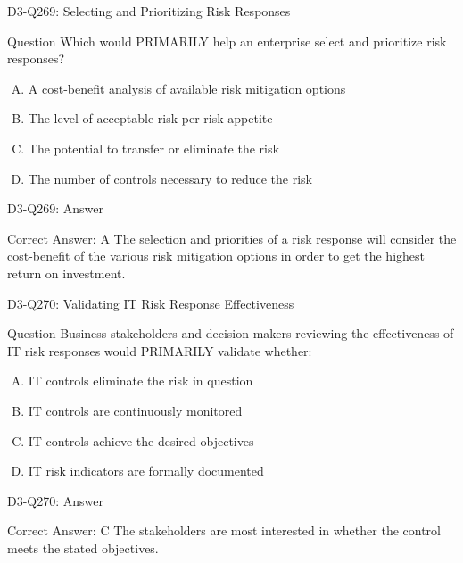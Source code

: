 \documentclass{beamer}
\begin{document}
	\begin{frame}{D3-Q269: Selecting and Prioritizing Risk Responses}
		\begin{block}{Question}
			Which would PRIMARILY help an enterprise select and prioritize risk responses?
		\end{block}
		\begin{enumerate}[(A)]
			\item A cost-benefit analysis of available risk mitigation options
			\item The level of acceptable risk per risk appetite
			\item The potential to transfer or eliminate the risk
			\item The number of controls necessary to reduce the risk
		\end{enumerate}
	\end{frame}
	\begin{frame}{D3-Q269: Answer}
		\begin{block}{Correct Answer: A}
			The selection and priorities of a risk response will consider the cost-benefit of the various risk mitigation options in order to get the highest return on investment.
		\end{block}
	\end{frame}
	
	\begin{frame}{D3-Q270: Validating IT Risk Response Effectiveness}
		\begin{block}{Question}
			Business stakeholders and decision makers reviewing the effectiveness of IT risk responses would PRIMARILY validate whether:
		\end{block}
		\begin{enumerate}[(A)]
			\item IT controls eliminate the risk in question
			\item IT controls are continuously monitored
			\item IT controls achieve the desired objectives
			\item IT risk indicators are formally documented
		\end{enumerate}
	\end{frame}
	\begin{frame}{D3-Q270: Answer}
		\begin{block}{Correct Answer: C}
			The stakeholders are most interested in whether the control meets the stated objectives.
		\end{block}
	\end{frame}
	
\end{document}
